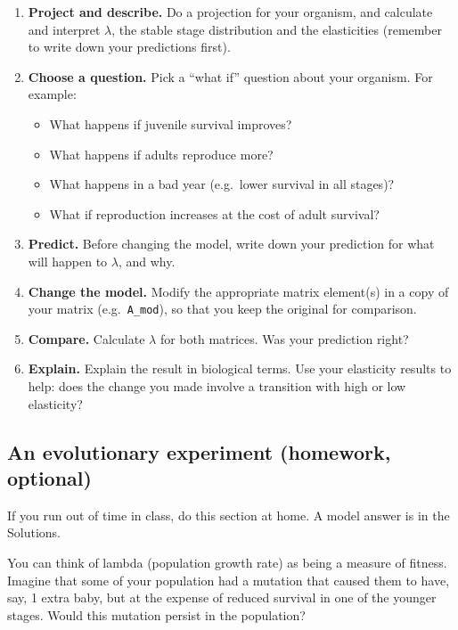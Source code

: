 \documentclass[
  a4paper]{book}
\providecommand{\tightlist}{%
  \setlength{\itemsep}{0pt}\setlength{\parskip}{0pt}}
\begin{document}
\begin{enumerate}
\def\labelenumi{\arabic{enumi}.}
\tightlist
\item
  \textbf{Project and describe.} Do a projection for your organism, and calculate and interpret \(\lambda\), the stable stage distribution and the elasticities (remember to write down your predictions first).
\item
  \textbf{Choose a question.} Pick a ``what if'' question about your organism. For example:

  \begin{itemize}
  \tightlist
  \item
    What happens if juvenile survival improves?
  \item
    What happens if adults reproduce more?
  \item
    What happens in a bad year (e.g.~lower survival in all stages)?
  \item
    What if reproduction increases at the cost of adult survival?
  \end{itemize}
\item
  \textbf{Predict.} Before changing the model, write down your prediction for what will happen to \(\lambda\), and why.
\item
  \textbf{Change the model.} Modify the appropriate matrix element(s) in a copy of your matrix (e.g.~\texttt{A\_mod}), so that you keep the original for comparison.
\item
  \textbf{Compare.} Calculate \(\lambda\) for both matrices. Was your prediction right?
\item
  \textbf{Explain.} Explain the result in biological terms. Use your elasticity results to help: does the change you made involve a transition with high or low elasticity?
\end{enumerate}

\subsection{An evolutionary experiment (homework, optional)}\label{an-evolutionary-experiment-homework-optional}

If you run out of time in class, do this section at home. A model answer is in the Solutions.

You can think of lambda (population growth rate) as being a measure of fitness. Imagine that some of your population had a mutation that caused them to have, say, 1 extra baby, but at the expense of reduced survival in one of the younger stages. Would this mutation persist in the population?
\end{document}
